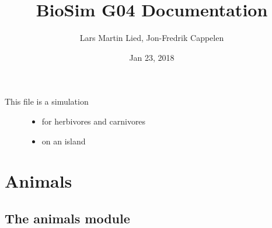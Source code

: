 \documentclass[a4paper,10pt,english]{sphinxmanual}
\title{BioSim G04 Documentation}
\date{Jan 23, 2018}
\author{Lars Martin Lied, Jon-Fredrik Cappelen}
\begin{document}
\maketitle
\sphinxtableofcontents
{}\label{\detokenize{index::doc}}

\begin{description}
\item[{This file is a simulation}] \leavevmode\begin{itemize}
\item {} 
for herbivores and carnivores

\item {} 
on an island

\end{itemize}

\end{description}


\chapter{Animals}
\label{\detokenize{animals:welcome-to-biosim-g04-s-documentation}}\label{\detokenize{animals:animals}}\label{\detokenize{animals::doc}}

\section{The animals module}
\label{\detokenize{animals:the-animals-module}}\label{\detokenize{animals:module-biosim.animals}}
\end{document}
